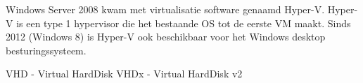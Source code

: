 Windows Server 2008 kwam met virtualisatie software genaamd Hyper-V. Hyper-V is een type 1 hypervisor die het bestaande OS tot de eerste VM maakt. Sinds 2012 (Windows 8) is Hyper-V ook beschikbaar voor het Windows desktop besturingssysteem.

VHD - Virtual HardDisk
VHDx - Virtual HardDisk v2
